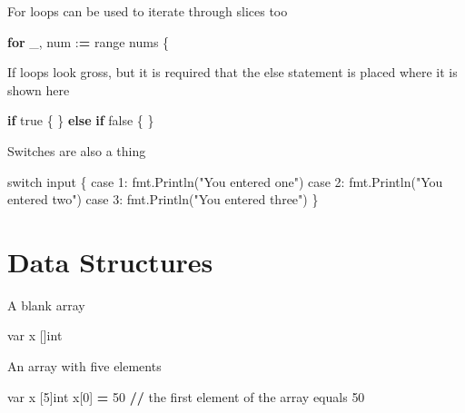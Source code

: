 \documentclass[]{book}
\newenvironment{Shaded}{\begin{snugshade}}{\end{snugshade}}
\newcommand{\DecValTok}[1]{\textcolor[rgb]{0.00,0.00,0.81}{#1}}
\newcommand{\StringTok}[1]{\textcolor[rgb]{0.31,0.60,0.02}{#1}}
\newcommand{\ControlFlowTok}[1]{\textcolor[rgb]{0.13,0.29,0.53}{\textbf{#1}}}
\newcommand{\OperatorTok}[1]{\textcolor[rgb]{0.81,0.36,0.00}{\textbf{#1}}}
\newcommand{\BuiltInTok}[1]{#1}
\newcommand{\NormalTok}[1]{#1}
\begin{document}
For loops can be used to iterate through slices too

\begin{Shaded}
\begin{Highlighting}[]
\ControlFlowTok{for}\NormalTok{ _, num :}\OperatorTok{=} \BuiltInTok{range}\NormalTok{ nums \{}
\end{Highlighting}
\end{Shaded}

If loops look gross, but it is required that the else statement is
placed where it is shown here

\begin{Shaded}
\begin{Highlighting}[]
\ControlFlowTok{if}\NormalTok{ true \{}
\NormalTok{\} }\ControlFlowTok{else} \ControlFlowTok{if}\NormalTok{ false \{}
\NormalTok{\}}
\end{Highlighting}
\end{Shaded}

Switches are also a thing

\begin{Shaded}
\begin{Highlighting}[]
\NormalTok{switch }\BuiltInTok{input}\NormalTok{ \{                          }
\NormalTok{    case }\DecValTok{1}\NormalTok{: fmt.Println(}\StringTok{"You entered one"}\NormalTok{)  }
\NormalTok{    case }\DecValTok{2}\NormalTok{: fmt.Println(}\StringTok{"You entered two"}\NormalTok{)  }
\NormalTok{    case }\DecValTok{3}\NormalTok{: fmt.Println(}\StringTok{"You entered three"}\NormalTok{)}
\NormalTok{\}                                           }
\end{Highlighting}
\end{Shaded}

\section{Data Structures}\label{data-structures}

A blank array

\begin{Shaded}
\begin{Highlighting}[]
\NormalTok{var x []}\BuiltInTok{int}
\end{Highlighting}
\end{Shaded}

An array with five elements

\begin{Shaded}
\begin{Highlighting}[]
\NormalTok{var x [}\DecValTok{5}\NormalTok{]}\BuiltInTok{int}
\NormalTok{x[}\DecValTok{0}\NormalTok{] }\OperatorTok{=} \DecValTok{50} \OperatorTok{//}\NormalTok{ the first element of the array equals }\DecValTok{50}
\end{Highlighting}
\end{Shaded}
\end{document}
